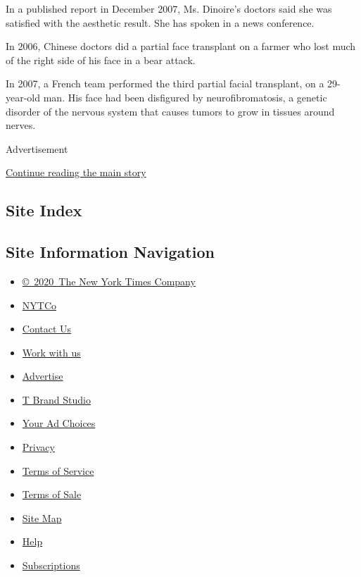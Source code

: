 In a published report in December 2007, Ms. Dinoire's doctors said she
was satisfied with the aesthetic result. She has spoken in a news
conference.

In 2006, Chinese doctors did a partial face transplant on a farmer who
lost much of the right side of his face in a bear attack.

In 2007, a French team performed the third partial facial transplant, on
a 29-year-old man. His face had been disfigured by neurofibromatosis, a
genetic disorder of the nervous system that causes tumors to grow in
tissues around nerves.

Advertisement

\protect\hyperlink{after-bottom}{Continue reading the main story}

\hypertarget{site-index}{%
\subsection{Site Index}\label{site-index}}

\hypertarget{site-information-navigation}{%
\subsection{Site Information
Navigation}\label{site-information-navigation}}

\begin{itemize}
\tightlist
\item
  \href{https://help.nytimes.com/hc/en-us/articles/115014792127-Copyright-notice}{©~2020~The
  New York Times Company}
\end{itemize}

\begin{itemize}
\tightlist
\item
  \href{https://www.nytco.com/}{NYTCo}
\item
  \href{https://help.nytimes.com/hc/en-us/articles/115015385887-Contact-Us}{Contact
  Us}
\item
  \href{https://www.nytco.com/careers/}{Work with us}
\item
  \href{https://nytmediakit.com/}{Advertise}
\item
  \href{http://www.tbrandstudio.com/}{T Brand Studio}
\item
  \href{https://www.nytimes.com/privacy/cookie-policy\#how-do-i-manage-trackers}{Your
  Ad Choices}
\item
  \href{https://www.nytimes.com/privacy}{Privacy}
\item
  \href{https://help.nytimes.com/hc/en-us/articles/115014893428-Terms-of-service}{Terms
  of Service}
\item
  \href{https://help.nytimes.com/hc/en-us/articles/115014893968-Terms-of-sale}{Terms
  of Sale}
\item
  \href{https://spiderbites.nytimes.com}{Site Map}
\item
  \href{https://help.nytimes.com/hc/en-us}{Help}
\item
  \href{https://www.nytimes.com/subscription?campaignId=37WXW}{Subscriptions}
\end{itemize}
